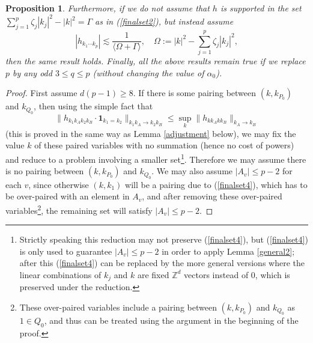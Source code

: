 \documentclass[11 pt,reqno]{amsart}
\newtheorem{prop}[thm]{Proposition}
\theoremstyle{definition}
\theoremstyle{remark}
\numberwithin{equation}{section}
\newcommand{\Zb}{\mathbb{Z}}
\begin{document}
{\begin{prop}
Furthermore, if we do not assume that $h$ is supported in the set $\sum_{j=1}^p\zeta_j|k_j|^2-|k|^2=\Gamma$ as in (\ref{finalset2}), but instead assume 
\begin{equation}\label{extrabdh}|h_{k_1\cdots k_p}|\lesssim\frac{1}{\langle \Omega+\Gamma\rangle},\quad \Omega:=|k|^2-\sum_{j=1}^p\zeta_j|k_j|^2,\end{equation}then the same result holds. Finally, all the above results remain true if we replace $p$ by any odd $3\leq q\leq p$ (without changing the value of $\alpha_0$).
\end{prop}
\begin{proof} First assume $d(p-1)\geq 8$. If there is some pairing between $(k,k_{P_0})$ and $k_{Q_0}$, then using the simple fact that
\[\|h_{k_1k_Ak_2k_B}\cdot\mathbf{1}_{k_1=k_2}\|_{k_1k_A\to k_2k_B}\leq\sup_k\|h_{kk_Akk_B}\|_{k_A\to k_B}\] (this is proved in the same way as Lemma \ref{adjustment} below), we may fix the value $k$ of these paired variables with no summation (hence no cost of powers) and reduce to a problem involving a smaller set\footnote{Strictly speaking this reduction may not preserve (\ref{finalset4}), but (\ref{finalset4}) is only used to guarantee $|A_v|\leq p-2$ in order to apply Lemma \ref{general2}; after this (\ref{finalset4}) can be replaced by the more general versions where the linear combinations of $k_j$ and $k$ are fixed $\Zb^d$ vectors instead of $0$, which is preserved under the reduction.}. Therefore we may assume there is no pairing between $(k,k_{P_0})$ and $k_{Q_0}$. We may also assume $|A_v|\leq p-2$ for each $v$, since otherwise $(k,k_1)$ will be a pairing due to (\ref{finalset4}), which has to be over-paired with an element in $A_v$, and after removing these over-paired variables\footnote{These over-paired variables include a pairing between $(k,k_{P_0})$ and $k_{Q_0}$ as $1\in Q_0$, and thus can be treated using the argument in the beginning of the proof.}, the remaining set will satisfy $|A_v|\leq p-2$.


\end{proof}}
\end{document}
